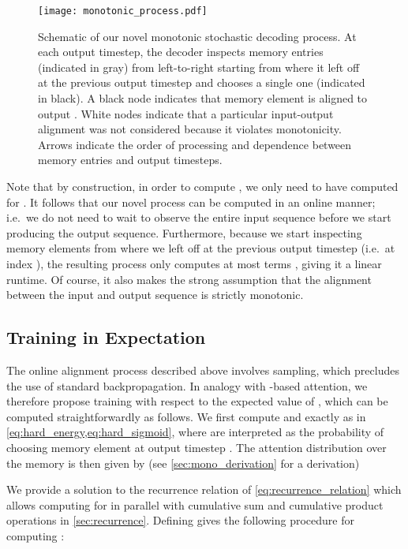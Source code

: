\documentclass{article}
\begin{document}
\begin{figure}[t]
\vskip 0.2in
\begin{center}
\centerline{\texttt{[image: monotonic\_process.pdf]}}
\caption{Schematic of our novel monotonic stochastic decoding process.
At each output timestep, the decoder inspects memory entries (indicated in gray) from left-to-right starting from where it left off at the previous output timestep and chooses a single one (indicated in black).
A black node indicates that memory element  is aligned to output .
White nodes indicate that a particular input-output alignment was not considered because it violates monotonicity.
Arrows indicate the order of processing and dependence between memory entries and output timesteps.}
\label{fig:monotonic_process}
\end{center}
\vskip -0.2in
\end{figure}

Note that by construction, in order to compute , we only need to have computed  for .
It follows that our novel process can be computed in an online manner; i.e.\ we do not need to wait to observe the entire input sequence before we start producing the output sequence.
Furthermore, because we start inspecting memory elements from where we left off at the previous output timestep (i.e.\ at index ), the resulting process only computes at most  terms , giving it a linear runtime.
Of course, it also makes the strong assumption that the alignment between the input and output sequence is strictly monotonic.

\subsection{Training in Expectation}
\label{sec:softly}

The online alignment process described above involves sampling, which precludes the use of standard backpropagation.
In analogy with -based attention, we therefore propose training with respect to the expected value of , which can be computed straightforwardly as follows.
We first compute  and  exactly as in \cref{eq:hard_energy,eq:hard_sigmoid}, where  are interpreted as the probability of choosing memory element  at output timestep .
The attention distribution over the memory is then given by (see \cref{sec:mono_derivation} for a derivation)

We provide a solution to the recurrence relation of \cref{eq:recurrence_relation} which allows computing  for  in parallel with cumulative sum and cumulative product operations in \cref{sec:recurrence}.
Defining  gives the following procedure for computing :
\end{document}
